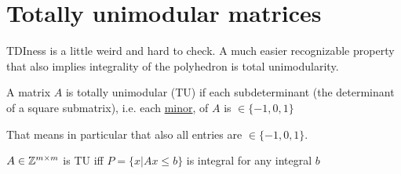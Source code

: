 \section{Totally unimodular matrices}

TDIness is a little weird and hard to check. A much easier recognizable property that also implies integrality of the polyhedron is total unimodularity.

\begin{Def} A matrix $A$ is totally unimodular (TU) if each subdeterminant (the determinant of a square submatrix), i.e. each \href{http://en.wikipedia.org/wiki/Minor\_\%28linear\_algebra\%29}{minor}, of $A$ is $\in \{-1,0,1\}$
\end{Def}

That means in particular that also all entries are $\in \{-1,0,1\}$.

\begin{thm} $A\in \mathbb{Z}^{m\times m}$ is TU iff $P=\{x|Ax\leq b\}$ is integral for any integral $b$
\end{thm}

